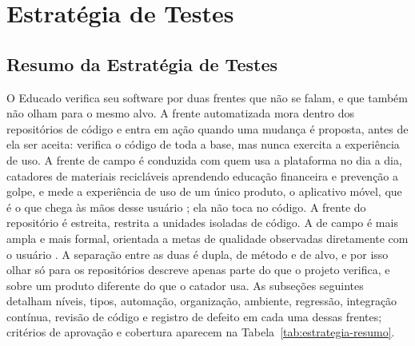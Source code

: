 \section{Estratégia de Testes}
\label{sec:estrategia}


\subsection{Resumo da Estratégia de Testes}

O Educado verifica seu software por duas frentes que não se falam, e que também
não olham para o mesmo alvo. A frente automatizada mora dentro dos repositórios
de código \cite{educado-repos} e entra em ação quando uma mudança é proposta,
antes de ela ser aceita: verifica o código de toda a base, mas nunca exercita a
experiência de uso. A frente de campo é conduzida com quem usa a plataforma no
dia a dia, catadores de materiais recicláveis aprendendo educação financeira e
prevenção a golpe, e mede a experiência de uso de um único produto, o aplicativo
móvel, que é o que chega às mãos desse usuário \cite{psp5}; ela não toca no
código. A frente do repositório é estreita, restrita a unidades isoladas de
código. A de campo é mais ampla e mais formal, orientada a metas de qualidade
observadas diretamente com o usuário \cite{dashboard}. A separação entre as duas
é dupla, de método e de alvo, e por isso olhar só para os repositórios descreve
apenas parte do que o projeto verifica, e sobre um produto diferente do que o
catador usa. As subseções seguintes detalham níveis, tipos, automação,
organização, ambiente, regressão, integração contínua, revisão de código e
registro de defeito em cada uma dessas frentes; critérios de aprovação e
cobertura aparecem na Tabela~\ref{tab:estrategia-resumo}.

